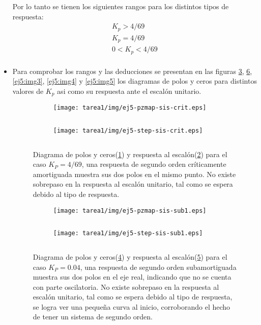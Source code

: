 \begin{ejercicio}
\begin{itemize}
    Por lo tanto se tienen los siguientes rangos para los distintos tipos de respuesta:
    \begin{align*}
      \tag{sobreamortiguada}
      K_p > 4/69
      \\
      \tag{críticamente amortiguada}
      K_p = 4/69
      \\
      \tag{subamortiguada}
      0 < K_p < 4/69
      \\
    \end{align*}

    \item
    Para comprobar los rangos y las deducciones se presentan en las figuras \ref{ej5:img1}, \ref{ej5:img2}, \ref{ej5:img3}, \ref{ej5:img4} y \ref{ej5:img5} los diagramas de polos y ceros para distintos valores de $K_p$ asi como su respuesta ante el escalón unitario.

    \begin{figure}[H]
      \centering
      \begin{subfigure}{0.48\textwidth}
        \centering
        \texttt{[image: tarea1/img/ej5-pzmap-sis-crit.eps]}
        \caption{$\quad$}
        \label{ej5:img1:a}
      \end{subfigure}
      \begin{subfigure}{0.48\textwidth}
        \centering
        \texttt{[image: tarea1/img/ej5-step-sis-crit.eps]}
        \caption{$\quad$}
        \label{ej5:img1:b}
      \end{subfigure}
      \caption{Diagrama de polos y ceros(\ref{ej5:img1:a}) y respuesta al escalón(\ref{ej5:img1:b}) para el caso $K_P = 4/69$, una respuesta de segundo orden críticamente amortiguada muestra sus dos polos en el mismo punto. No existe sobrepaso en la respuesta al escalón unitario, tal como se espera debido al tipo de respuesta.}
      \label{ej5:img1}
    \end{figure}
    
    \begin{figure}[H]
      \centering
      \begin{subfigure}{0.48\textwidth}
        \centering
        \texttt{[image: tarea1/img/ej5-pzmap-sis-sub1.eps]}
        \caption{$\quad$}
        \label{ej5:img2:a}
      \end{subfigure}
      \begin{subfigure}{0.48\textwidth}
        \centering
        \texttt{[image: tarea1/img/ej5-step-sis-sub1.eps]}
        \caption{$\quad$}
        \label{ej5:img2:b}
      \end{subfigure}
      \caption{Diagrama de polos y ceros(\ref{ej5:img2:a}) y respuesta al escalón(\ref{ej5:img2:b}) para el caso $K_P = 0.04$, una respuesta de segundo orden subamortiguada muestra sus dos polos en el eje real, indicando que no se cuenta con parte oscilatoria. No existe sobrepaso en la respuesta al escalón unitario, tal como se espera debido al tipo de respuesta, se logra ver una pequeña curva al inicio, corroborando el hecho de tener un sistema de segundo orden.}
      \label{ej5:img2}
    \end{figure}


\end{itemize}
\end{ejercicio}
